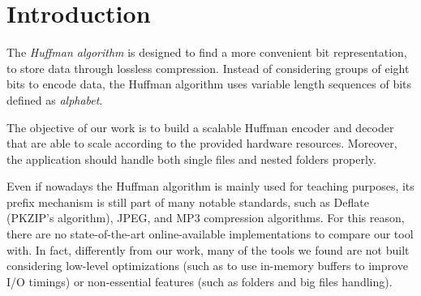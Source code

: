 \section{Introduction}
The \emph{Huffman algorithm} is designed to find a more convenient bit representation, to store data through lossless compression. Instead of considering groups of eight bits to encode data, the Huffman algorithm uses variable length sequences of bits defined as \emph{alphabet}.

The objective of our work is to build a scalable Huffman encoder and decoder that are able to scale according to the provided hardware resources. Moreover, the application should handle both single files and nested folders properly.

Even if nowadays the Huffman algorithm is mainly used for teaching purposes, its prefix mechanism is still part of many notable standards, such as Deflate (PKZIP's algorithm), JPEG, and MP3 compression algorithms. For this reason, there are no state-of-the-art online-available implementations to compare our tool with. In fact, differently from our work, many of the tools we found are not built considering low-level optimizations (such as to use in-memory buffers to improve I/O timings) or non-essential features (such as folders and big files handling).
